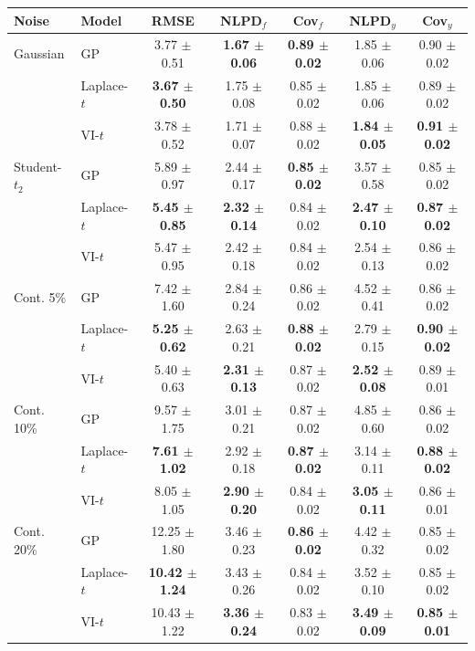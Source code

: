 \begin{tabular}{llccccc}
\toprule
Noise & Model & RMSE & NLPD$_f$ & Cov$_f$ & NLPD$_y$ & Cov$_y$ \\
\midrule
Gaussian & GP & 3.77 $\pm$ 0.51 & \textbf{1.67 $\pm$ 0.06} & \textbf{0.89 $\pm$ 0.02} & 1.85 $\pm$ 0.06 & 0.90 $\pm$ 0.02 \\
 & Laplace-$t$ & \textbf{3.67 $\pm$ 0.50} & 1.75 $\pm$ 0.08 & 0.85 $\pm$ 0.02 & 1.85 $\pm$ 0.06 & 0.89 $\pm$ 0.02 \\
 & VI-$t$ & 3.78 $\pm$ 0.52 & 1.71 $\pm$ 0.07 & 0.88 $\pm$ 0.02 & \textbf{1.84 $\pm$ 0.05} & \textbf{0.91 $\pm$ 0.02} \\
\midrule
Student-$t_2$ & GP & 5.89 $\pm$ 0.97 & 2.44 $\pm$ 0.17 & \textbf{0.85 $\pm$ 0.02} & 3.57 $\pm$ 0.58 & 0.85 $\pm$ 0.02 \\
 & Laplace-$t$ & \textbf{5.45 $\pm$ 0.85} & \textbf{2.32 $\pm$ 0.14} & 0.84 $\pm$ 0.02 & \textbf{2.47 $\pm$ 0.10} & \textbf{0.87 $\pm$ 0.02} \\
 & VI-$t$ & 5.47 $\pm$ 0.95 & 2.42 $\pm$ 0.18 & 0.84 $\pm$ 0.02 & 2.54 $\pm$ 0.13 & 0.86 $\pm$ 0.02 \\
\midrule
Cont. 5\% & GP & 7.42 $\pm$ 1.60 & 2.84 $\pm$ 0.24 & 0.86 $\pm$ 0.02 & 4.52 $\pm$ 0.41 & 0.86 $\pm$ 0.02 \\
 & Laplace-$t$ & \textbf{5.25 $\pm$ 0.62} & 2.63 $\pm$ 0.21 & \textbf{0.88 $\pm$ 0.02} & 2.79 $\pm$ 0.15 & \textbf{0.90 $\pm$ 0.02} \\
 & VI-$t$ & 5.40 $\pm$ 0.63 & \textbf{2.31 $\pm$ 0.13} & 0.87 $\pm$ 0.02 & \textbf{2.52 $\pm$ 0.08} & 0.89 $\pm$ 0.01 \\
\midrule
Cont. 10\% & GP & 9.57 $\pm$ 1.75 & 3.01 $\pm$ 0.21 & 0.87 $\pm$ 0.02 & 4.85 $\pm$ 0.60 & 0.86 $\pm$ 0.02 \\
 & Laplace-$t$ & \textbf{7.61 $\pm$ 1.02} & 2.92 $\pm$ 0.18 & \textbf{0.87 $\pm$ 0.02} & 3.14 $\pm$ 0.11 & \textbf{0.88 $\pm$ 0.02} \\
 & VI-$t$ & 8.05 $\pm$ 1.05 & \textbf{2.90 $\pm$ 0.20} & 0.84 $\pm$ 0.02 & \textbf{3.05 $\pm$ 0.11} & 0.86 $\pm$ 0.01 \\
\midrule
Cont. 20\% & GP & 12.25 $\pm$ 1.80 & 3.46 $\pm$ 0.23 & \textbf{0.86 $\pm$ 0.02} & 4.42 $\pm$ 0.32 & 0.85 $\pm$ 0.02 \\
 & Laplace-$t$ & \textbf{10.42 $\pm$ 1.24} & 3.43 $\pm$ 0.26 & 0.84 $\pm$ 0.02 & 3.52 $\pm$ 0.10 & 0.85 $\pm$ 0.02 \\
 & VI-$t$ & 10.43 $\pm$ 1.22 & \textbf{3.36 $\pm$ 0.24} & 0.83 $\pm$ 0.02 & \textbf{3.49 $\pm$ 0.09} & \textbf{0.85 $\pm$ 0.01} \\

\end{tabular}
